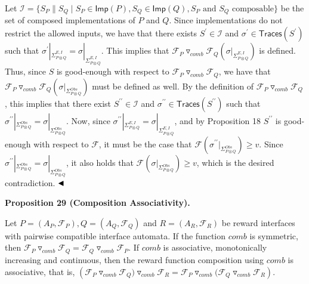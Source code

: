 \documentclass[10pt,a4paper]{article}
\begin{document}
 
Let $\mathcal{I}=\{S_{P}\parallel S_{Q}\mid S_{P}\in\mathsf{Imp}(P),S_{Q}\in\mathsf{Imp}(Q),S_{P}\text{ and }S_{Q}\text{ composable}\}$ be the set of composed implementations of $P$ and $Q$. Since implementations do not restrict the allowed inputs, we have that there exists $S^{\prime}\in\mathcal{I}$ and $\sigma^{\prime}\in\mathsf{Traces}(S^{\prime})$ such that $\sigma^{\prime}|_{\Sigma_{P\otimes Q}^{E,I}}=\sigma|_{\Sigma_{P\otimes Q}^{E,I}}$. This implies that ${{\mathcal{F}_{P}}\mathbin{\triangledown_{\mathit{comb}}}{\mathcal{F}_{Q}}}(\sigma|_{\Sigma_{P\otimes Q}^{E,I}})$ is defined. Thus, since $S$ is good-enough with respect to ${{\mathcal{F}_{P}}\mathbin{\triangledown_{\mathit{comb}}}{\mathcal{F}_{Q}}}$, we have that ${{\mathcal{F}_{P}}\mathbin{\triangledown_{\mathit{comb}}}{\mathcal{F}_{Q}}}(\sigma|_{\Sigma_{P\otimes Q}^{Obs}})$ must be defined as well. By the definition of ${{\mathcal{F}_{P}}\mathbin{\triangledown_{\mathit{comb}}}{\mathcal{F}_{Q}}}$, this implies that there exist $S^{\prime\prime}\in\mathcal{I}$ and $\sigma^{\prime\prime}\in\mathsf{Traces}(S^{\prime\prime})$ such that $\sigma^{\prime\prime}|_{\Sigma_{P\otimes Q}^{Obs}}=\sigma|_{\Sigma_{P\otimes Q}^{Obs}}$. Now, since $\sigma^{\prime\prime}|_{\Sigma_{P\otimes Q}^{E,I}}=\sigma|_{\Sigma_{P\otimes Q}^{E,I}}$, and by Proposition 18 $S^{\prime\prime}$ is good-enough with respect to $\mathcal{F}$, it must be the case that $\mathcal{F}(\sigma^{\prime\prime}|_{\Sigma_{P\otimes Q}^{Obs}})\geq v$. Since $\sigma^{\prime\prime}|_{\Sigma_{P\otimes Q}^{Obs}}=\sigma|_{\Sigma_{P\otimes Q}^{Obs}}$, it also holds that $\mathcal{F}(\sigma|_{\Sigma_{P\otimes Q}^{Obs}})\geq v$, which is the desired contradiction. $\hfill\blacktriangleleft$\par
 
 
 
\par\medskip\noindent\textbf{Proposition 29 (Composition Associativity).}\par
 
 
Let $P=(A_{P},\mathcal{F}_{P}),Q=(A_{Q},\mathcal{F}_{Q})$ and $R=(A_{R},\mathcal{F}_{R})$ be reward interfaces with pairwise compatible interface automata. If the function $\mathit{comb}$ is symmetric, then ${{\mathcal{F}_{P}}\mathbin{\triangledown_{\mathit{comb}}}{\mathcal{F}_{Q}}}={{\mathcal{F}_{Q}}\mathbin{\triangledown_{\mathit{comb}}}{\mathcal{F}_{P}}}$. If $\mathit{comb}$ is associative, monotonically increasing and continuous, then the reward function composition using $\mathit{comb}$ is associative, that is, $({{{{\mathcal{F}_{P}}\mathbin{\triangledown_{\mathit{comb}}}{\mathcal{F}_{Q})}}}\mathbin{\triangledown_{\mathit{comb}}}{\mathcal{F}_{R}}}={{\mathcal{F}_{P}}\mathbin{\triangledown_{\mathit{comb}}}{{{(\mathcal{F}_{Q}}\mathbin{\triangledown_{\mathit{comb}}}{\mathcal{F}_{R}}}}})$.\par
 
\end{document}
